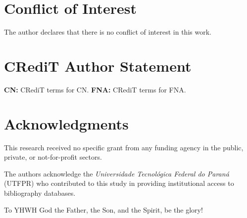 
\section*{Conflict of Interest}

    The author declares that there is no conflict of interest in this work.



\section*{CRediT Author Statement}

    \textbf{CN:} CRediT terms for CN. \textbf{FNA:} CRediT terms for FNA.



\section*{Acknowledgments}

    This research received no specific grant from any funding agency in the public, private,  or
    not-for-profit sectors.

    The authors acknowledge the \textit{Universidade Tecnológica Federal do Paraná} (UTFPR)  who
    contributed to this study in providing institutional access to bibliography databases.

    To YHWH God the Father, the Son, and the Spirit, be the glory!




